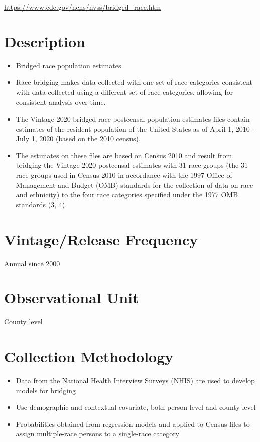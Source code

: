 \documentclass[
]{book}
\providecommand{\tightlist}{%
  \setlength{\itemsep}{0pt}\setlength{\parskip}{0pt}}
\begin{document}
\url{https://www.cdc.gov/nchs/nvss/bridged_race.htm}

\hypertarget{description-14}{%
\section{Description}\label{description-14}}

\begin{itemize}
\tightlist
\item
  Bridged race population estimates.
\item
  Race bridging makes data collected with one set of race categories consistent with data collected using a different set of race categories, allowing for consistent analysis over time.
\item
  The Vintage 2020 bridged-race postcensal population estimates files contain estimates of the resident population of the United States as of April 1, 2010 - July 1, 2020 (based on the 2010 census).
\item
  The estimates on these files are based on Census 2010 and result from bridging the Vintage 2020 postcensal estimates with 31 race groups (the 31 race groups used in Census 2010 in accordance with the 1997 Office of Management and Budget (OMB) standards for the collection of data on race and ethnicity) to the four race categories specified under the 1977 OMB standards (3, 4).
\end{itemize}

\hypertarget{vintagerelease-frequency-14}{%
\section{Vintage/Release Frequency}\label{vintagerelease-frequency-14}}

Annual since 2000

\hypertarget{observational-unit-14}{%
\section{Observational Unit}\label{observational-unit-14}}

County level

\hypertarget{collection-methodology-14}{%
\section{Collection Methodology}\label{collection-methodology-14}}

\begin{itemize}
\tightlist
\item
  Data from the National Health Interview Surveys (NHIS) are used to develop models for bridging
\item
  Use demographic and contextual covariate, both person-level and county-level
\item
  Probabilities obtained from regression models and applied to Census files to assign multiple-race persons to a single-race category
\end{itemize}
\end{document}
